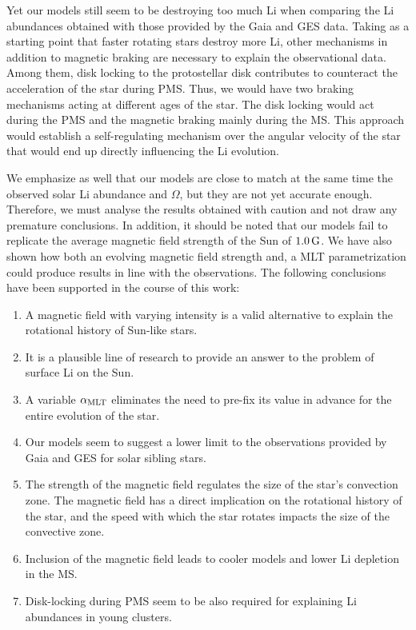 \documentclass[fleqn,usenatbib]{mnras}
\begin{document}
Yet our models still seem to be destroying too much Li when comparing the Li abundances obtained with those provided by the Gaia and GES data. Taking as a starting point that faster rotating stars destroy more Li, other mechanisms in addition to magnetic braking are necessary to explain the observational data. Among them, disk locking to the protostellar disk contributes to counteract the acceleration of the star during PMS. Thus, we would have two braking mechanisms acting at different ages of the star. The disk locking would act during the PMS and the magnetic braking mainly during the MS. This approach would establish a self-regulating mechanism over the angular velocity of the star that would end up directly influencing the Li evolution.\par

We emphasize as well that our models are close to match at the same time the observed solar Li abundance and $\Omega$, but they are not yet accurate enough. Therefore, we must analyse the results obtained with caution and not draw any premature conclusions. In addition, it should be noted that our models fail to replicate the average magnetic field strength of the Sun of $1.0\,\mathrm{G}$. We have also shown how both an evolving magnetic field strength and, a MLT parametrization could produce results in line with the observations. The following conclusions have been supported in the course of this work:

\begin{enumerate}
    \item A magnetic field with varying intensity is a valid alternative to explain the rotational history of Sun-like stars.
    \item It is a plausible line of research to provide an answer to the problem of surface Li on the Sun.
    \item A variable $\alpha_{\mathrm{MLT}}$ eliminates the need to pre-fix its value in advance for the entire evolution of the star.
    \item Our models seem to suggest a lower limit to the observations provided by Gaia and GES for solar sibling stars.
    \item The strength of the magnetic field regulates the size of the star's convection zone. The magnetic field has a direct implication on the rotational history of the star, and the speed with which the star rotates impacts the size of the convective zone.     
    \item Inclusion of the magnetic field leads to cooler models and lower Li depletion in the MS.
    \item Disk-locking during PMS seem to be also required for explaining Li abundances in young clusters.
\end{enumerate}
\par
\end{document}
